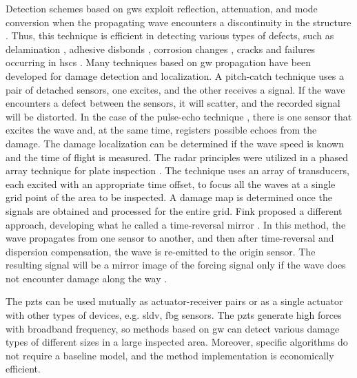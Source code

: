 Detection schemes based on \acp{gw} exploit reflection, attenuation, and mode conversion when the propagating wave encounters a discontinuity in the structure \cite{alleyne1992interaction}.
Thus, this technique is efficient in detecting various types of defects, such as delamination \cite{sohn2011delamination,tian2015delamination}, adhesive disbonds \cite{rucka2018damage,balasubramaniam2021ultrasonic}, corrosion changes \cite{alleyne1995long,lowe1998defect}, cracks \cite{tua2004detection,lu2006crack,zima2020detection} and failures occurring in \acp{hsc} \cite{mustapha2011assessment, sikdar2016guided, sikdar2016ultrasonic,radzienski2016assessment, yu2019core}.
Many techniques based on \ac{gw} propagation have been developed for damage detection and localization.
A pitch-catch technique \cite{ihn2008pitch, sikdar2017structural} uses a pair of detached sensors, one excites, and the other receives a signal.
If the wave encounters a defect between the sensors, it will scatter, and the recorded signal will be distorted.
In the case of the pulse-echo technique \cite{guo1993interaction, kudela2008damage}, there is one sensor that excites the wave and, at the same time, registers possible echoes from the damage.
The damage localization can be determined if the wave speed is known and the time of flight is measured.
The radar principles were utilized in a phased array technique for plate inspection \cite{giurgiutiu2004embedded, ostachowicz2008elastic, kudela2018structural}.
The technique uses an array of transducers, each excited with an appropriate time offset, to focus all the waves at a single grid point of the area to be inspected.
A damage map is determined once the signals are obtained and processed for the entire grid.
Fink proposed a different approach, developing what he called a time-reversal mirror \cite{fink1992time}.
In this method, the wave propagates from one sensor to another, and then after time-reversal and dispersion compensation, the wave is re-emitted to the origin sensor.
The resulting signal will be a mirror image of the forcing signal only if the wave does not encounter damage along the way \cite{park2007time, eremin2016analytically}.

The \acp{pzt} can be used mutually as actuator-receiver pairs or as a single actuator with other types of devices, e.g. \ac{sldv}, \ac{fbg} sensors.
The \acp{pzt} generate high forces with broadband frequency, so methods based on \ac{gw} can detect various damage types of different sizes in a large inspected area.
Moreover, specific algorithms do not require a baseline model, and the method implementation is economically efficient.

